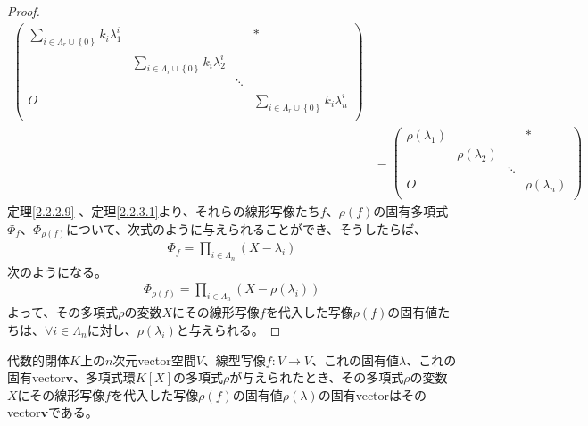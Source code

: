 \documentclass[dvipdfmx]{jsarticle}
\begin{document}
\begin{proof}
\begin{align*}
\begin{pmatrix}
\sum_{i \in \varLambda_{r} \cup \left\{ 0 \right\}} {k_{i}\lambda_{1}^{i}} & \  & \  & * \\
\  & \sum_{i \in \varLambda_{r} \cup \left\{ 0 \right\}} {k_{i}\lambda_{2}^{i}} & \  & \  \\
\  & \  & \ddots & \  \\
O & \  & \  & \sum_{i \in \varLambda_{r} \cup \left\{ 0 \right\}} {k_{i}\lambda_{n}^{i}} \\
\end{pmatrix}\\
&= \begin{pmatrix}
\rho\left( \lambda_{1} \right) & \  & \  & * \\
\  & \rho\left( \lambda_{2} \right) & \  & \  \\
\  & \  & \ddots & \  \\
O & \  & \  & \rho\left( \lambda_{n} \right) \\
\end{pmatrix}
\end{align*}
定理\ref{2.2.2.9} 、定理\ref{2.2.3.1}より、それらの線形写像たち$f$、$\rho(f)$の固有多項式$\varPhi_{f}$、$\varPhi_{\rho(f)}$について、次式のように与えられることができ、そうしたらば、
\begin{align*}
\varPhi_{f} = \prod_{i \in \varLambda_{n}} \left( X - \lambda_{i} \right)
\end{align*}
次のようになる。
\begin{align*}
\varPhi_{\rho(f)} = \prod_{i \in \varLambda_{n}} \left( X - \rho\left( \lambda_{i} \right) \right)
\end{align*}
よって、その多項式$\rho$の変数$X$にその線形写像$f$を代入した写像$\rho(f)$の固有値たちは、$\forall i \in \varLambda_{n}$に対し、$\rho\left( \lambda_{i} \right)$と与えられる。
\end{proof}
\begin{thm}\label{2.2.3.8}
代数的閉体$K$上の$n$次元vector空間$V$、線型写像$f:V \rightarrow V$、これの固有値$\lambda$、これの固有vector$\mathbf{v}$、多項式環$K[ X]$の多項式$\rho$が与えられたとき、その多項式$\rho$の変数$X$にその線形写像$f$を代入した写像$\rho(f)$の固有値$\rho(\lambda)$の固有vectorはそのvector$\mathbf{v}$である。
\end{thm}
\end{document}
